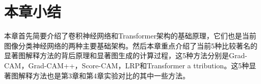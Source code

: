 \section{本章小结}
本章首先简要介绍了卷积神经网络和Transformer架构的基础原理，它们也是当前图像分类神经网络的两种主要基础架构。然后本章重点介绍了当前5种比较著名的显著图解释方法的背后原理和显著图生成的计算过程，这5种方法分别是Grad-CAM，Grad-CAM++，Score-CAM，LRP和Transformer a ttribution。这5种显著图解释方法也是第3章和第4章实验对比的其中一些方法。




